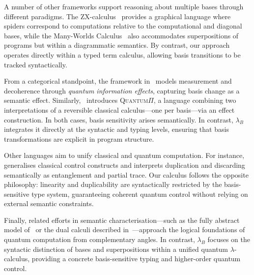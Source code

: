 \documentclass[runningheads,orivec,envcountsame,envcountsect]{llncs}
\newcommand{\lambdaB}{\lambda_B}
\begin{document}
A number of other frameworks support reasoning about multiple bases through
different paradigms.  
The ZX-calculus~\cite{CoeckeRossICALP08} provides a graphical language where
spiders correspond to computations relative to the computational and diagonal
bases, while the Many-Worlds
Calculus~\cite{ChardonnetdeVismeValironVilmartLMCS25} also accommodates
superpositions of programs but within a diagrammatic semantics.  
By contrast, our approach operates directly within a typed term calculus,
allowing basis transitions to be tracked syntactically.

From a categorical standpoint, the framework
in~\cite{HeunenKaarsgaard2021} models measurement and decoherence through
\emph{quantum information effects}, capturing basis change as a semantic
effect.  
Similarly,~\cite{CaretteJeunenKaarsgaardSabry2024} introduces
\textsc{Quantum}$\Pi$, a language combining two interpretations of a reversible
classical calculus—one per basis—via an effect construction.  
In both cases, basis sensitivity arises semantically.  
In contrast, $\lambdaB$ integrates it directly at the syntactic and typing
levels, ensuring that basis transformations are explicit in program structure.

Other languages aim to unify classical and quantum computation.
For instance,~\cite{VoichickLiRandHicks2023} generalises classical
control constructs and interprets duplication and discarding semantically as
entanglement and partial trace.  
Our calculus follows the opposite philosophy: linearity and duplicability are
syntactically restricted by the basis-sensitive type system, guaranteeing
coherent quantum control without relying on external semantic constraints.

Finally, related efforts in semantic characterisation—such as the fully
abstract model of~\cite{ClairambaultdeVisme2019} or the dual calculi
described in~\cite{ChoudhuryGay2025}—approach the logical foundations of
quantum computation from complementary angles.  
In contrast, $\lambdaB$ focuses on the syntactic distinction of bases and
superpositions within a unified quantum $\lambda$-calculus, providing a concrete
basis-sensitive typing and higher-order quantum control.
\end{document}
